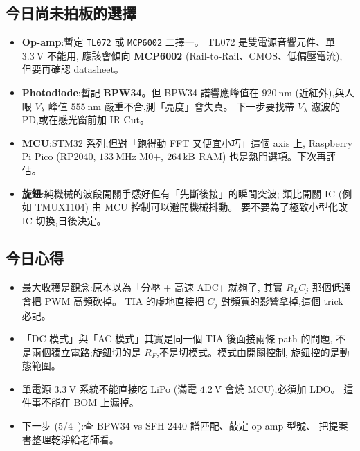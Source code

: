 \subsection*{今日尚未拍板的選擇}

\begin{itemize}[leftmargin=2em,itemsep=0pt]
  \item \textbf{Op-amp}:暫定 \texttt{TL072} 或 \texttt{MCP6002} 二擇一。
        TL072 是雙電源音響元件、單 \(\SI{3.3}{\volt}\) 不能用,
        應該會傾向 \textbf{MCP6002} (Rail-to-Rail、CMOS、低偏壓電流),
        但要再確認 datasheet。
  \item \textbf{Photodiode}:暫記 \textbf{BPW34}。但 BPW34 譜響應峰值在
        \(\SI{920}{\nano\metre}\) (近紅外),與人眼 \(V_\lambda\)
        峰值 \(\SI{555}{\nano\metre}\) 嚴重不合,測「亮度」會失真。
        下一步要找帶 \(V_\lambda\) 濾波的 PD,或在感光窗前加 IR-Cut。
  \item \textbf{MCU}:STM32 系列;但對「跑得動 FFT 又便宜小巧」這個 axis 上,
        Raspberry Pi Pico (RP2040, \(\SI{133}{\mega\hertz}\) M0+, \(\SI{264}{\kilo\byte}\)
        RAM) 也是熱門選項。下次再評估。
  \item \textbf{旋鈕}:純機械的波段開關手感好但有「先斷後接」的瞬間突波;
        類比開關 IC (例如 TMUX1104) 由 MCU 控制可以避開機械抖動。
        要不要為了極致小型化改 IC 切換,日後決定。
\end{itemize}

\subsection*{今日心得}

\begin{itemize}[leftmargin=2em,itemsep=0pt]
  \item 最大收穫是觀念:原本以為「分壓 + 高速 ADC」就夠了,
        其實 \(R_L C_j\) 那個低通會把 PWM 高頻砍掉。
        TIA 的虛地直接把 \(C_j\) 對頻寬的影響拿掉,這個 trick 必記。
  \item 「DC 模式」與「AC 模式」其實是同一個 TIA 後面接兩條 path 的問題,
        不是兩個獨立電路;旋鈕切的是 \(R_F\),不是切模式。模式由開關控制,
        旋鈕控的是動態範圍。
  \item 單電源 \(\SI{3.3}{\volt}\) 系統不能直接吃 LiPo
        (滿電 \(\SI{4.2}{\volt}\) 會燒 MCU),必須加 LDO。
        這件事不能在 BOM 上漏掉。
  \item 下一步 (5/4--):查 BPW34 vs SFH-2440 譜匹配、敲定 op-amp 型號、
        把提案書整理乾淨給老師看。
\end{itemize}
